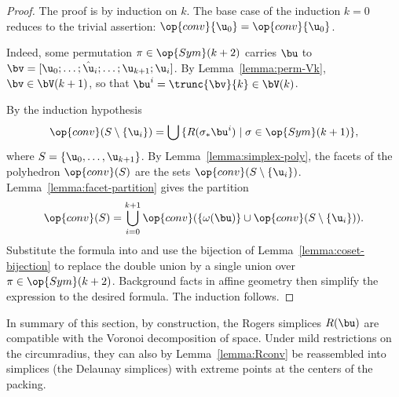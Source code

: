 \begin{proof} The proof is by induction on $k$.  The base case of the induction $k=0$
reduces to the trivial assertion: $\op{conv}\{\u_0\} = \op{conv}\{\u_0\}$.  



  Indeed,  some permutation
$\pi\in \op{Sym}(k+2)$ carries $\bu$ to
$\bv=[\u_0;\ldots;\hat\u_i;\ldots;\u_{k+1};\u_i]$.  By
Lemma~\ref{lemma:perm-Vk}, $\bv\in \bV(k+1)$, so that $\bu^i =
\trunc{\bv}{k}\in \bV(k)$.

By the induction hypothesis 
\begin{equation}\label{eqn:sigma} 
\op{conv}(S\setminus\{\u_i\}) = \bigcup \,\{ R(\sigma_*\bu^i) \mid \sigma\in \op{Sym}(k+1)\},
\end{equation}
where $S = \{\u_0,\ldots,\u_{k+1}\}$.
By Lemma~\ref{lemma:simplex-poly}, the facets of the polyhedron
$\op{conv}(S)$ are the sets $\op{conv}(S\setminus\{\u_i\})$.
Lemma~\ref{lemma:facet-partition} gives the partition
\begin{equation} \label{eqn:convS}
\op{conv}(S) = \bigcup_{i=0}^{k+1} \op{conv}(\{\omega(\bu)\}\cup \op{conv}(S\setminus\{\u_i\})).
\end{equation}
Substitute the formula  into  and  use the bijection of
Lemma~\ref{lemma:coset-bijection} to replace the double union by a single union
over $\pi\in \op{Sym}(k+2)$.  Background facts in affine
geometry then simplify the expression to the desired formula.  The
induction follows.
%
%
%
\end{proof}



In summary of this section, by construction, the Rogers simplices
$R(\bu)$ are compatible with the Voronoi decomposition of space.
Under mild restrictions on the circumradius, they can also by Lemma~\ref{lemma:Rconv} be
reassembled into simplices (the Delaunay simplices) with extreme
points at the centers of the packing.
%
%




